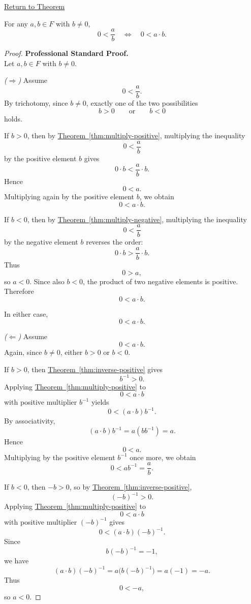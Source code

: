 \newpage
{}
\label{prf:positive-fraction-iff-positive-product}

\begin{remark*}[Return]
\hyperref[thm:positive-fraction-iff-positive-product]{Return to Theorem}
\end{remark*}

\begin{theorem*}
For any $a,b\in F$ with $b\neq 0$,
\[
0<\frac{a}{b}
\quad\Longleftrightarrow\quad
0<a\cdot b.
\]
\end{theorem*}

\begin{proof}
\textbf{Professional Standard Proof.}~\\
Let $a,b\in F$ with $b\neq 0$.

\emph{($\Rightarrow$)} Assume
\[
0<\frac{a}{b}.
\]
By trichotomy, since $b\neq 0$, exactly one of the two possibilities
\[
b>0
\qquad\text{or}\qquad
b<0
\]
holds.

If $b>0$, then by
\hyperref[thm:multiply-positive]{Theorem~\ref*{thm:multiply-positive}},
multiplying the inequality
\[
0<\frac{a}{b}
\]
by the positive element $b$ gives
\[
0\cdot b<\frac{a}{b}\cdot b.
\]
Hence
\[
0<a.
\]
Multiplying again by the positive element $b$, we obtain
\[
0<a\cdot b.
\]

If $b<0$, then by
\hyperref[thm:multiply-negative]{Theorem~\ref*{thm:multiply-negative}},
multiplying the inequality
\[
0<\frac{a}{b}
\]
by the negative element $b$ reverses the order:
\[
0\cdot b>\frac{a}{b}\cdot b.
\]
Thus
\[
0>a,
\]
so $a<0$.  Since also $b<0$, the product of two negative elements is
positive.  Therefore
\[
0<a\cdot b.
\]

In either case,
\[
0<a\cdot b.
\]

\emph{($\Leftarrow$)} Assume
\[
0<a\cdot b.
\]
Again, since $b\neq 0$, either $b>0$ or $b<0$.

If $b>0$, then
\hyperref[thm:inverse-positive]{Theorem~\ref*{thm:inverse-positive}}
gives
\[
b^{-1}>0.
\]
Applying
\hyperref[thm:multiply-positive]{Theorem~\ref*{thm:multiply-positive}}
to
\[
0<a\cdot b
\]
with positive multiplier $b^{-1}$ yields
\[
0<(a\cdot b)b^{-1}.
\]
By associativity,
\[
(a\cdot b)b^{-1}=a(bb^{-1})=a.
\]
Hence
\[
0<a.
\]
Multiplying by the positive element $b^{-1}$ once more, we obtain
\[
0<ab^{-1}=\frac{a}{b}.
\]

If $b<0$, then $-b>0$, so by
\hyperref[thm:inverse-positive]{Theorem~\ref*{thm:inverse-positive}},
\[
(-b)^{-1}>0.
\]
Applying
\hyperref[thm:multiply-positive]{Theorem~\ref*{thm:multiply-positive}}
to
\[
0<a\cdot b
\]
with positive multiplier $(-b)^{-1}$ gives
\[
0<(a\cdot b)(-b)^{-1}.
\]
Since
\[
b(-b)^{-1}=-1,
\]
we have
\[
(a\cdot b)(-b)^{-1}=a\bigl(b(-b)^{-1}\bigr)=a(-1)=-a.
\]
Thus
\[
0<-a,
\]
so $a<0$.


\end{proof}
